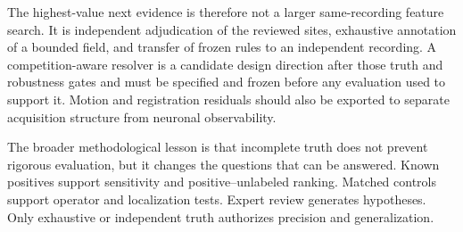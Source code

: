 The highest-value next evidence is therefore not a larger same-recording feature
search. It is independent adjudication of the \VenueReviewedCandidates{}
reviewed sites, exhaustive
annotation of a bounded field, and transfer of frozen rules to an independent
recording. A competition-aware resolver is a candidate design direction after
those truth and robustness gates and must be specified and frozen before any
evaluation used to support it. Motion and registration residuals should also be exported to
separate acquisition structure from neuronal observability.

The broader methodological lesson is that incomplete truth does not prevent
rigorous evaluation, but it changes the questions that can be answered. Known
positives support sensitivity and positive--unlabeled ranking. Matched controls
support operator and localization tests. Expert review generates hypotheses.
Only exhaustive or independent truth authorizes precision and generalization.
